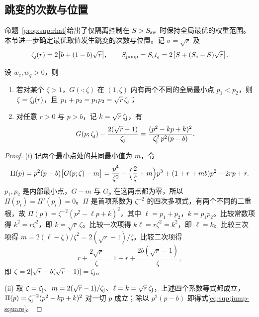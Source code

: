 \subsection{跳变的次数与位置}
\label{sec:sup:weight-jumps}
命题~\ref{prop:sup:rhat}给出了仅隔离控制在 $S>S_{\rm sw}$ 时保持全局最优的权重范围。本节进一步确定最优取值发生跳变的次数与位置。记 $\sigma=\sqrt r$ 及
\begin{equation}
\zeta_{\rm j}(r)=2\bigl[b+(1-b)\sqrt r\bigr],\qquad
S_{\rm jump}=S_c\zeta_{\rm j}=2\bigl[\bar S+(S_c-\bar S)\sqrt r\bigr].
\label{eq:sup:jump-state}
\end{equation}
\begin{lemma}
\label{lem:sup:interior-tie}
设 $w_c,w_q>0$，则
\begin{enumerate}
\renewcommand{\labelenumi}{(\roman{enumi})}
\item 若对某个 $\zeta>1$，$G(\cdot;\zeta)$ 在 $(1,\zeta)$ 内有两个不同的全局最小点 $p_1<p_2$，则 $\zeta=\zeta_{\rm j}(r)$，且 $p_1+p_2=p_1p_2=\sqrt r\,\zeta_{\rm j}$；
\item 对任意 $r>0$ 与 $p>b$，记 $k=\sqrt r\,\zeta_{\rm j}$，有
\begin{equation}
G(p;\zeta_{\rm j})-\frac{2(\sqrt r-1)}{\zeta_{\rm j}}
=\frac{(p^2-kp+k)^2}{\zeta_{\rm j}^2\,p^2(p-b)}.
\label{eq:sup:jump-square}
\end{equation}
\end{enumerate}
\end{lemma}
\begin{proof}
(i) 记两个最小点处的共同最小值为 $m$，令
\[
\Pi(p)=p^2(p-b)\bigl[G(p;\zeta)-m\bigr]
=\frac{p^4}{\zeta^2}-\Bigl(\frac2\zeta+m\Bigr)p^3+(1+r+mb)p^2-2rp+r.
\]
$p_1,p_2$ 是内部最小点，$G-m$ 与 $G_p$ 在这两点都为零，所以 $\Pi(p_i)=\Pi'(p_i)=0$。$\Pi$ 是首项系数为 $\zeta^{-2}$ 的四次多项式，有两个不同的二重根，故 $\Pi(p)=\zeta^{-2}(p^2-\ell p+k)^2$，其中 $\ell=p_1+p_2$，$k=p_1p_2$。比较常数项得 $k^2=r\zeta^2$，即 $k=\sqrt r\,\zeta$。比较一次项得 $k\ell=r\zeta^2=k^2$，即 $\ell=k$。比较三次项得 $m=2(\ell-\zeta)/\zeta^2=2(\sqrt r-1)/\zeta$。比较二次项得
\[
r+\frac{2\sqrt r}{\zeta}=1+r+\frac{2b(\sqrt r-1)}{\zeta},
\]
即 $\zeta=2[\sqrt r-b(\sqrt r-1)]=\zeta_{\rm j}$。

(ii) 取 $\zeta=\zeta_{\rm j}$、$m=2(\sqrt r-1)/\zeta_{\rm j}$、$\ell=k=\sqrt r\,\zeta_{\rm j}$，上述四个系数等式都成立，$\Pi(p)=\zeta_{\rm j}^{-2}(p^2-kp+k)^2$ 对一切 $p$ 成立；除以 $p^2(p-b)$ 即得式\eqref{eq:sup:jump-square}。
\end{proof}
